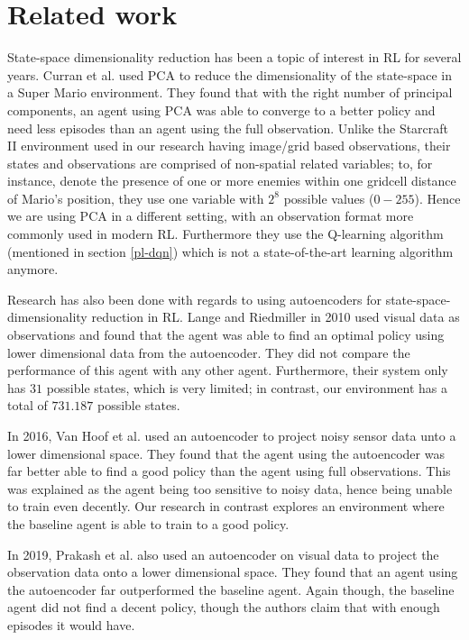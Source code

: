 \chapter{Related work}\label{relatedwork}
State-space dimensionality reduction has been a topic of interest in RL for several years. Curran et al. \cite{mario} used PCA to reduce the dimensionality of the state-space in a Super Mario environment. They found that with the right number of principal components, an agent using PCA was able to converge to a better policy and need less episodes than an agent using the full observation. Unlike the Starcraft II environment used in our research having image/grid based observations, their states and observations are comprised of non-spatial related variables; to, for instance, denote the presence of one or more enemies within one gridcell distance of Mario's position, they use one variable with $2^8$ possible values ($0-255$). Hence we are using PCA in a different setting, with an observation format more commonly used in modern RL. Furthermore they use the Q-learning algorithm (mentioned in section \ref{pl-dqn}) which is not a state-of-the-art learning algorithm anymore.

Research has also been done with regards to using autoencoders for state-space-dimensionality reduction in RL. Lange and Riedmiller in 2010 \cite{AE_2010} used visual data as observations and found that the agent was able to find an optimal policy using lower dimensional data from the autoencoder. They did not compare the performance of this agent with any other agent. Furthermore, their system only has $31$ possible states, which is very limited; in contrast, our environment has a total of $731.187$ possible states. 

In 2016, Van Hoof et al. \cite{AE_2016} used an autoencoder to project noisy sensor data unto a lower dimensional space. They found that the agent using the autoencoder was far better able to find a good policy than the agent using full observations. This was explained as the agent being too sensitive to noisy data, hence being unable to train even decently. Our research in contrast explores an environment where the baseline agent is able to train to a good policy.

In 2019, Prakash et al. \cite{AE_2019} also used an autoencoder on visual data to project the observation data onto a lower dimensional space. They found that an agent using the autoencoder far outperformed the baseline agent. Again though, the baseline agent did not find a decent policy, though the authors claim that with enough episodes it would have.


